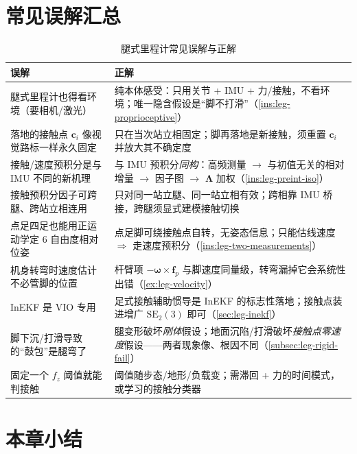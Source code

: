 \section*{常见误解汇总}
\begin{table}[H]\centering\small
\caption{腿式里程计常见误解与正解}
\label{tab:leg-misconceptions}
\begin{tabular}{p{} p{}}
\toprule
误解 & 正解 \\
\midrule
腿式里程计也得看环境（要相机/激光）& 纯本体感受：只用关节 + IMU + 力/接触，不看环境；唯一隐含假设是“脚不打滑”（\cref{ins:leg-proprioceptive}）\\
落地的接触点 $\mathbf{c}_i$ 像视觉路标一样永久固定 & 只在当次站立相固定；脚再落地是新接触，须重置 $\mathbf{c}_i$ 并放大其不确定度 \\
接触/速度预积分是与 IMU 不同的新机理 & 与 IMU 预积分\emph{同构}：高频测量 $\to$ 与初值无关的相对增量 $\to$ 因子图 $\to$ $\boldsymbol{\Lambda}$ 加权（\cref{ins:leg-preint-iso}）\\
接触预积分因子可跨腿、跨站立相连用 & 只对同一站立腿、同一站立相有效；跨相靠 IMU 桥接，跨腿须显式建模接触切换 \\
点足四足也能用正运动学定 $6$ 自由度相对位姿 & 点足脚可绕接触点自转，无姿态信息；只能估线速度 $\Rightarrow$ 走速度预积分（\cref{ins:leg-two-measurements}）\\
机身转弯时速度估计不必管脚的位置 & 杆臂项 $-\boldsymbol{\omega}\times\mathbf{f}_p$ 与脚速度同量级，转弯漏掉它会系统性出错（\cref{ex:leg-velocity}）\\
InEKF 是 VIO 专用 & 足式接触辅助惯导是 InEKF 的标志性落地；接触点装进增广 $\mathrm{SE}_2(3)$ 即可（\cref{sec:leg-inekf}）\\
脚下沉/打滑导致的“鼓包”是腿弯了 & 腿变形破坏\emph{刚体}假设；地面沉陷/打滑破坏\emph{接触点零速度}假设——两者现象像、根因不同（\cref{subsec:leg-rigid-fail}）\\
固定一个 $f_z$ 阈值就能判接触 & 阈值随步态/地形/负载变；需滞回 + 力的时间模式，或学习的接触分类器 \\
\bottomrule
\end{tabular}
\end{table}

\section*{本章小结}

